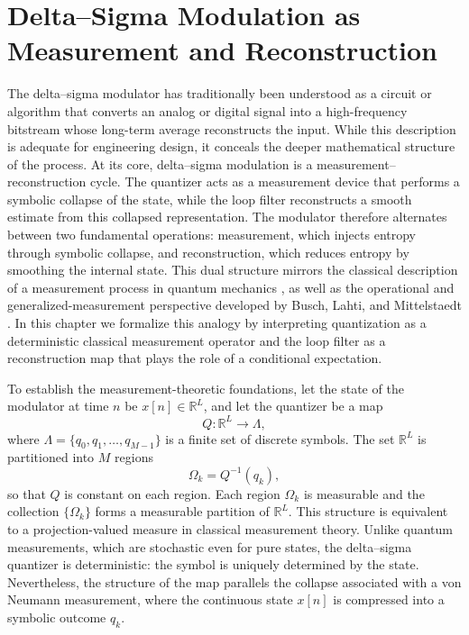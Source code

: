 
\chapter{Delta--Sigma Modulation as Measurement and Reconstruction}

The delta--sigma modulator has traditionally been understood as a circuit or algorithm that converts an analog or digital signal into a high-frequency bitstream whose long-term average reconstructs the input. While this description is adequate for engineering design, it conceals the deeper mathematical structure of the process. At its core, delta--sigma modulation is a measurement--reconstruction cycle. The quantizer acts as a measurement device that performs a symbolic collapse of the state, while the loop filter reconstructs a smooth estimate from this collapsed representation. The modulator therefore alternates between two fundamental operations: measurement, which injects entropy through symbolic collapse, and reconstruction, which reduces entropy by smoothing the internal state. This dual structure mirrors the classical description of a measurement process in quantum mechanics \cite{vonneumann1932foundations}, as well as the operational and generalized-measurement perspective developed by Busch, Lahti, and Mittelstaedt \cite{busch1996quantummeasurement}. In this chapter we formalize this analogy by interpreting quantization as a deterministic classical measurement operator and the loop filter as a reconstruction map that plays the role of a conditional expectation.

To establish the measurement-theoretic foundations, let the state of the modulator at time $n$ be $x[n] \in \mathbb{R}^{L}$, and let the quantizer be a map
\[
Q : \mathbb{R}^{L} \to \Lambda,
\]
where $\Lambda = \{q_{0}, q_{1}, \ldots, q_{M-1}\}$ is a finite set of discrete symbols. The set $\mathbb{R}^{L}$ is partitioned into $M$ regions
\[
\Omega_{k} = Q^{-1}(q_{k}),
\]
so that $Q$ is constant on each region. Each region $\Omega_{k}$ is measurable and the collection $\{\Omega_{k}\}$ forms a measurable partition of $\mathbb{R}^{L}$. This structure is equivalent to a projection-valued measure in classical measurement theory. Unlike quantum measurements, which are stochastic even for pure states, the delta--sigma quantizer is deterministic: the symbol is uniquely determined by the state. Nevertheless, the structure of the map parallels the collapse associated with a von Neumann measurement, where the continuous state $x[n]$ is compressed into a symbolic outcome $q_{k}$.

